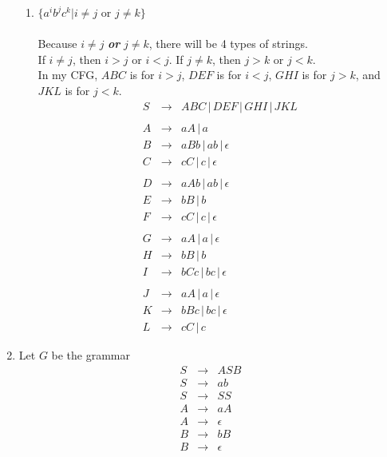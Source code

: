 \documentclass[10pt,a4paper,final]{article}
\begin{document}
\begin{enumerate}
\begin{enumerate}
  \item %
  $\{a^i b^j c^k | i \neq j$ or $j \neq k\}$ \\
  \\
  Because $i \neq j$ \textbf{\emph{or}} $j \neq k$, there will be 4 types of strings. \\
  If $i \neq j$, then $i > j$ or $i < j$.
  If $j \neq k$, then $j > k$ or $j < k$.\\
  In my CFG, $ABC$ is for $i > j$, $DEF$ is for $i < j$, $GHI$ is for $j > k$, and
  $JKL$ is for $j < k$.
  \begin{eqnarray*}
  S &\rightarrow& ABC \,|\, DEF \,|\, GHI \,|\, JKL \\
  \\
  A &\rightarrow& aA \,|\, a \\
  B &\rightarrow& aBb \,|\, ab \,|\, \epsilon \\
  C &\rightarrow& cC \,|\, c \,|\, \epsilon \\
  \\
  D &\rightarrow& aAb \,|\, ab \,|\, \epsilon \\
  E &\rightarrow& bB \,|\, b \\
  F &\rightarrow& cC \,|\, c \,|\, \epsilon \\
  \\
  G &\rightarrow& aA \,|\, a \,|\, \epsilon \\
  H &\rightarrow& bB \,|\, b \\
  I &\rightarrow& bCc \,|\, bc \,|\, \epsilon \\
  \\
  J &\rightarrow& aA \,|\, a \,|\, \epsilon \\
  K &\rightarrow& bBc \,|\, bc \,|\, \epsilon \\
  L &\rightarrow& cC \,|\, c
  \end{eqnarray*}
\end{enumerate}

\item %
Let $G$ be the grammar
\begin{eqnarray}
  S &\rightarrow& ASB \\
  S &\rightarrow& ab \\
  S &\rightarrow& SS \\
  A &\rightarrow& aA \\
  A &\rightarrow& \epsilon \\
  B &\rightarrow& bB \\
  B &\rightarrow& \epsilon
\end{eqnarray}


\end{enumerate}
\end{document}

